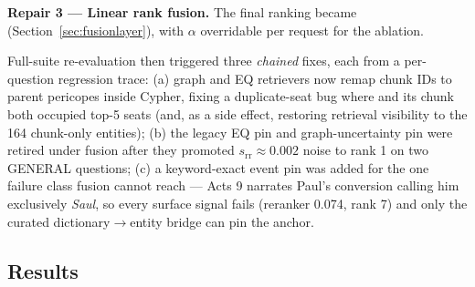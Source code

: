 \textbf{Repair 3 --- Linear rank fusion.} The final ranking became
\fusedeq (Section~\ref{sec:fusionlayer}), with $\alpha$ overridable per
request for the ablation.

Full-suite re-evaluation then triggered three \emph{chained} fixes,
each from a per-question regression trace: (a) graph and EQ retrievers
now remap chunk IDs to parent pericopes inside Cypher, fixing a
duplicate-seat bug where  and its chunk
 both occupied top-5 seats (and, as a side effect,
restoring retrieval visibility to the 164 chunk-only entities); (b) the
legacy EQ pin and graph-uncertainty pin were retired under fusion after
they promoted $s_{\mathrm{rr}}\!\approx\!0.002$ noise to rank 1 on two
GENERAL questions; (c) a keyword-exact event pin was added for the one
failure class fusion cannot reach --- Acts 9 narrates Paul's conversion
calling him exclusively \emph{Saul}, so every surface signal fails
(reranker 0.074, rank 7) and only the curated dictionary$\to$entity
bridge can pin the anchor.

\subsection{Results}

